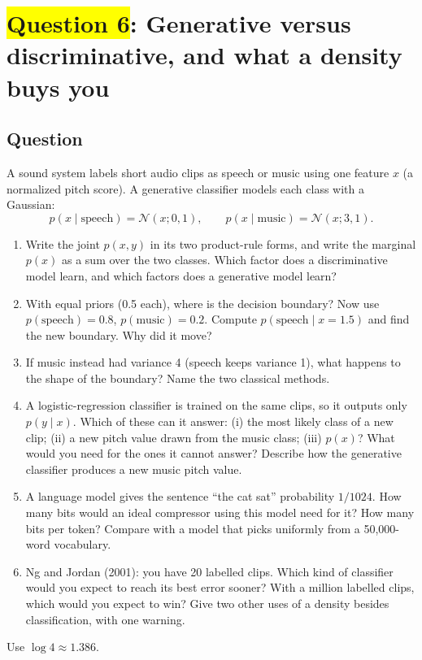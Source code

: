 \documentclass[12pt,a4paper]{article}
\begin{document}
\section{\texorpdfstring{\colorbox{yellow}{Question 6}}{Question 6}: Generative versus discriminative, and what a density buys you}

\subsection{Question}

A sound system labels short audio clips as speech or music using one feature $x$ (a normalized pitch score). A generative classifier models each class with a Gaussian:
\[
p(x\mid\text{speech})=\mathcal{N}(x;0,1),\qquad p(x\mid\text{music})=\mathcal{N}(x;3,1).
\]
\begin{enumerate}[label=(\alph*)]
  \item[\colorbox{yellow}{(a)}] Write the joint $p(x,y)$ in its two product-rule forms, and write the marginal $p(x)$ as a sum over the two classes. Which factor does a discriminative model learn, and which factors does a generative model learn?
  \item[\colorbox{yellow}{(b)}] With equal priors (0.5 each), where is the decision boundary? Now use $p(\text{speech})=0.8$, $p(\text{music})=0.2$. Compute $p(\text{speech}\mid x=1.5)$ and find the new boundary. Why did it move?
  \item[\colorbox{yellow}{(c)}] If music instead had variance 4 (speech keeps variance 1), what happens to the shape of the boundary? Name the two classical methods.
  \item[\colorbox{yellow}{(d)}] A logistic-regression classifier is trained on the same clips, so it outputs only $p(y\mid x)$. Which of these can it answer: (i) the most likely class of a new clip; (ii) a new pitch value drawn from the music class; (iii) $p(x)$? What would you need for the ones it cannot answer? Describe how the generative classifier produces a new music pitch value.
  \item A language model gives the sentence ``the cat sat'' probability $1/1024$. How many bits would an ideal compressor using this model need for it? How many bits per token? Compare with a model that picks uniformly from a 50,000-word vocabulary.
  \item[\colorbox{yellow}{(f)}] Ng and Jordan (2001): you have 20 labelled clips. Which kind of classifier would you expect to reach its best error sooner? With a million labelled clips, which would you expect to win? Give two other uses of a density besides classification, with one warning.
\end{enumerate}
Use $\log 4\approx1.386$.
\end{document}
